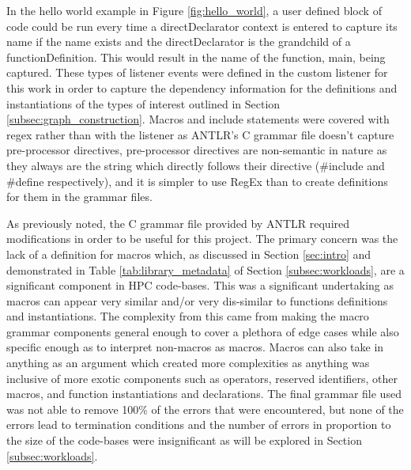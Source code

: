 In the hello world example in Figure \ref{fig:hello_world}, a user defined block of code could be run every time a directDeclarator context is entered to capture its name if the name exists and the directDeclarator is the grandchild of a functionDefinition. This would result in the name of the function, main, being captured. These types of listener events were defined in the custom listener for this work in order to capture the dependency information for the definitions and instantiations of the types of interest outlined in Section \ref{subsec:graph_construction}. Macros and include statements were covered with regex rather than with the listener as ANTLR's C grammar file doesn't capture pre-processor directives, pre-processor directives are non-semantic in nature as they always are the string which directly follows their directive (\#include and \#define respectively), and it is simpler to use RegEx than to create definitions for them in the grammar files.

As previously noted, the C grammar file provided by ANTLR required modifications in order to be useful for this project. The primary concern was the lack of a definition for macros which, as discussed in Section \ref{sec:intro} and demonstrated in Table \ref{tab:library_metadata} of Section \ref{subsec:workloads}, are a significant component in HPC code-bases. This was a significant undertaking as macros can appear very similar and/or very dis-similar to functions definitions and instantiations. The complexity from this came from making the macro grammar components general enough to cover a plethora of edge cases while also specific enough as to interpret non-macros as macros. Macros can also take in anything as an argument which created more complexities as anything was inclusive of more exotic components such as operators, reserved identifiers, other macros, and function instantiations and declarations. The final grammar file used was not able to remove 100\% of the errors that were encountered, but none of the errors lead to termination conditions and the number of errors in proportion to the size of the code-bases were insignificant as will be explored in Section \ref{subsec:workloads}.

